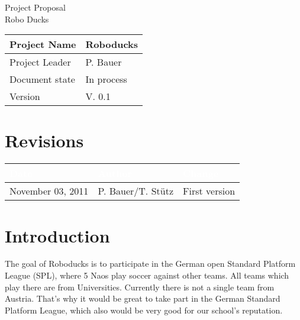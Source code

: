\documentclass[12pt]{article}
\theoremstyle{definition}
\newenvironment{explanation}{%
   \setlength{\parindent}{0pt}
   \itshape
   \color{blue}
}{}
\newcommand{\projectname}{Roboducks}
\newcommand{\productname}{Robo Ducks}
\newcommand{\projectleader}{P. Bauer}
\newcommand{\documentstatus}{In process}
\newcommand{\version}{V. 0.1}
\begin{document}
\begin{titlepage}
\begin{flushright}

\end{flushright}

\vspace{10em}

\begin{center}
{\Huge Project Proposal} \\[3em]
{\LARGE \productname} \\[3em]
\end{center}

\begin{flushleft}
\begin{tabular}{|l|l|}
\hline
Project Name & \projectname \\ \hline
Project Leader & \projectleader \\ \hline
Document state & \documentstatus \\ \hline
Version & \version \\ \hline
\end{tabular}
\end{flushleft}

\end{titlepage}
\section*{Revisions}
\begin{tabular}{|l|l|l|}
\hline
\cellcolor[gray]{0.5}\textcolor{white}{Date} & \cellcolor[gray]{0.5}\textcolor{white}{Author} & \cellcolor[gray]{0.5}\textcolor{white}{Change} \\ \hline
November 03, 2011&P. Bauer/T. Stütz&First version \\ \hline
\end{tabular}
\pagebreak

\tableofcontents
\pagebreak

\section{Introduction}
\begin{explanation}
The goal of Roboducks is to participate in the German open Standard Platform League (SPL), where 5 Naos play soccer against other teams. All teams which play there are from Universities. Currently there is not a single team from Austria. That's why it would be great to take part in the German Standard Platform League, which also would be very good for our school's reputation.\\
\end{explanation}
\pagebreak
\end{document}
